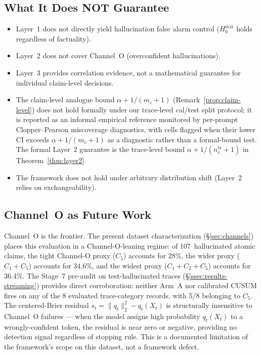 \documentclass[runningheads]{llncs}
\newcommand{\Hnull}{H_0^{\text{stat}}}
\begin{document}
\subsection{What It Does NOT Guarantee}
\begin{itemize}
    \item Layer~1 does not directly yield hallucination false alarm control
          ($\Hnull$ holds regardless of factuality).
    \item Layer~2 does not cover Channel~O (overconfident hallucinations).
    \item Layer~3 provides correlation evidence, not a mathematical guarantee
          for individual claim-level decisions.
    \item The claim-level analogue bound $\alpha + 1/(m_c+1)$
          (Remark~\ref{prop:claim-level}) does not hold formally under
          our trace-level cal/test split protocol; it is reported as an
          informal empirical reference monitored by per-prompt
          Clopper--Pearson miscoverage diagnostics, with cells flagged
          when their lower CI exceeds $\alpha + 1/(m_c+1)$ as a
          diagnostic rather than a formal-bound test. The formal Layer~2
          guarantee is the trace-level bound
          $\alpha + 1/(n_c^{\text{tr}}+1)$ in Theorem~\ref{thm:layer2}.
    \item The framework does not hold under arbitrary distribution shift
          (Layer~2 relies on exchangeability).
\end{itemize}

\subsection{Channel~O as Future Work}

Channel~O is the frontier. The present dataset characterization
(\S\ref{sec:channels}) places this evaluation in a Channel-O-leaning
regime: of 107~hallucinated atomic claims, the tight Channel-O proxy
($C_5$) accounts for 28\%, the wider proxy ($C_1 + C_5$) accounts for
34.6\%, and the widest proxy ($C_1 + C_2 + C_5$) accounts for 36.4\%.
The Stage~7 pre-audit on test-hallucinated traces (\S\ref{ssec:results-streaming})
provides direct corroboration: neither Arm~A nor calibrated CUSUM fires
on any of the 8 evaluated trace-category records, with 5/8 belonging to
$C_5$. The centered-Brier residual $s_t = \|q_t\|_2^2 - q_t(X_t)$ is
structurally insensitive to Channel~O failures — when the model assigns
high probability $q_t(X_t)$ to a wrongly-confident token, the residual is
near zero or negative, providing no detection signal regardless of stopping
rule. This is a documented limitation of the framework's scope on this
dataset, not a framework defect.
\end{document}
